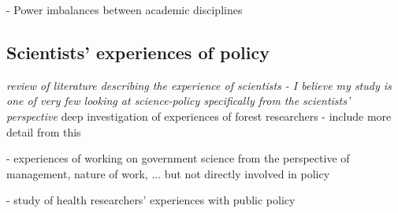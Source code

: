 \cite{BalvaneraJNOBCDGGKKMPSSW2020} - Power imbalances between academic disciplines

\subsection{Scientists' experiences of policy}\label{sec:experiences}
\emph{review of literature describing the experience of scientists - I believe my study is one of very few looking at science-policy specifically from the scientists' perspective}
\cite{OjanenBKP2021} deep investigation of experiences of forest researchers  - include more detail from this

\cite{DanfordDR2009} - experiences of working on government science from the perspective of management, nature of work, ... but not directly involved in policy

\cite{KothariME2009} - study of health researchers' experiences with public policy




